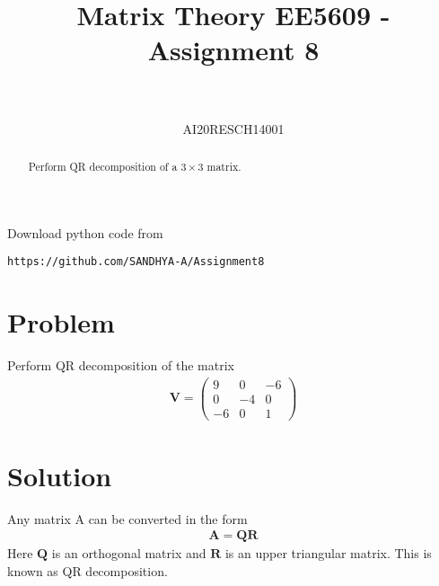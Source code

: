 \documentclass[journal,12pt,twocolumn]{IEEEtran}
\let\vec\mathbf
\numberwithin{equation}{subsection}
\newcommand{\myvec}[1]{\ensuremath{\begin{pmatrix}#1\end{pmatrix}}}
\begin{document}
\title{Matrix Theory EE5609 - Assignment 8\\
}

\author{\\
 \\
AI20RESCH14001\\
 }

\maketitle
\begin{abstract}
Perform QR decomposition of a $3 \times 3$ matrix.
\end{abstract}
Download  python code from 
\begin{lstlisting}
https://github.com/SANDHYA-A/Assignment8
\end{lstlisting}
\section{Problem}
Perform QR decomposition of the matrix
\begin{align}
   \vec{V} = \myvec{9&0&-6\\0&-4&0\\-6&0&1}  \label{1.1}
\end{align}
\section{Solution}
Any matrix A can be converted in the form 
\begin{align}
    \vec{A} = \vec{Q}\vec{R}\label{2.1}
\end{align}
Here  $\vec{Q}$ is an orthogonal matrix and $\vec{R}$ is an upper triangular matrix. This is known as QR decomposition.
\end{document}
